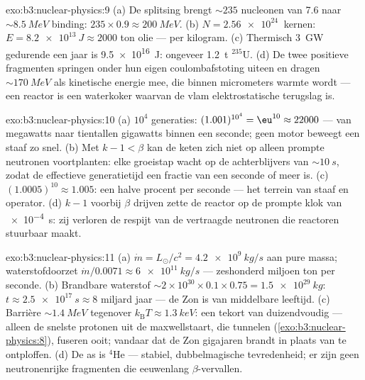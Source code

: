 \begin{solution}{exo:b3:nuclear-physics:9}
(a) De splitsing brengt ${\sim}235$ nucleonen van \qty{7.6}{} naar
${\sim}\qty{8.5}{MeV}$ binding: $235\times0.9 \approx
\qty{200}{MeV}$. (b) $N = \qty{2.56e24}{}$ kernen:
$E = \qty{8.2e13}{J} \approx 2000$ ton olie --- per
kilogram. (c) Thermisch \qty{3}{GW} gedurende een jaar is
\qty{9.5e16}{J}: ongeveer \qty{1.2}{t} $^{235}$U. (d) De twee
positieve fragmenten springen onder hun eigen coulombafstoting
uiteen en dragen ${\sim}\qty{170}{MeV}$ als kinetische energie
mee, die binnen micrometers warmte wordt --- een reactor is een waterkoker
waarvan de vlam elektrostatische terugslag is.
\end{solution}

\begin{solution}{exo:b3:nuclear-physics:10}
(a) $10^4$ generaties: $(1.001)^{10^4} = \eu^{10} \approx
22000$ --- van megawatts naar tientallen gigawatts binnen een seconde; geen
motor beweegt een staaf zo snel. (b) Met $k - 1 < \beta$ kan de keten
zich niet op alleen prompte neutronen voortplanten: elke groeistap
wacht op de achterblijvers van ${\sim}\qty{10}{s}$, zodat de effectieve
generatietijd een fractie van een seconde of meer is. (c)
$(1.0005)^{10} \approx 1.005$: een halve procent per seconde ---
het terrein van staaf en operator. (d) $k - 1$ voorbij $\beta$ drijven
zette de reactor op de prompte klok van \qty{e-4}{s}: zij verloren de
respijt van de vertraagde neutronen die reactoren stuurbaar maakt.
\end{solution}

\begin{solution}{exo:b3:nuclear-physics:11}
(a) $\dot m = L_\odot/c^2 = \qty{4.2e9}{kg/s}$ aan pure massa;
waterstofdoorzet $\dot m/0.0071 \approx \qty{6e11}{kg/s}$ ---
zeshonderd miljoen ton per seconde. (b) Brandbare waterstof
${\sim}2\times10^{30}\times0.1\times0.75 = \qty{1.5e29}{kg}$:
$t \approx \qty{2.5e17}{s} \approx 8$ miljard jaar --- de Zon
is van middelbare leeftijd. (c) Barrière ${\sim}\qty{1.4}{MeV}$ tegenover
$k_{\text{B}}T \approx \qty{1.3}{keV}$: een tekort van duizendvoudig
--- alleen de snelste protonen uit de maxwellstaart, die tunnelen
(\cref{exo:b3:nuclear-physics:8}), fuseren ooit; vandaar dat de Zon
gigajaren brandt in plaats van te ontploffen. (d) De as is
$^4$He --- stabiel, dubbelmagische tevredenheid; er zijn geen
neutronenrijke fragmenten die eeuwenlang $\beta$-vervallen.
\end{solution}

